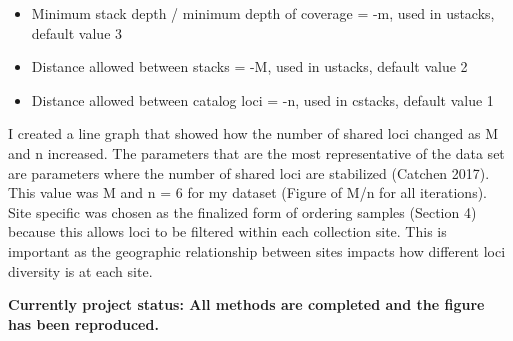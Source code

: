 \begin{itemize}
\itemsep1pt\parskip0pt
\item
  Minimum stack depth / minimum depth of coverage = -m, used in ustacks,
  default value 3
\item
  Distance allowed between stacks = -M, used in ustacks, default value 2
\item
  Distance allowed between catalog loci = -n, used in cstacks, default
  value 1
\end{itemize}

I created a line graph that showed how the number of shared loci changed
as M and n increased. The parameters that are the most representative of
the data set are parameters where the number of shared loci are
stabilized (Catchen 2017). This value was M and n = 6 for my dataset
(Figure of M/n for all iterations). Site specific was chosen as the
finalized form of ordering samples (Section 4) because this allows loci
to be filtered within each collection site. This is important as the
geographic relationship between sites impacts how different loci
diversity is at each site.

\textbf{Currently project status: All methods are completed and the
figure has been reproduced.}
